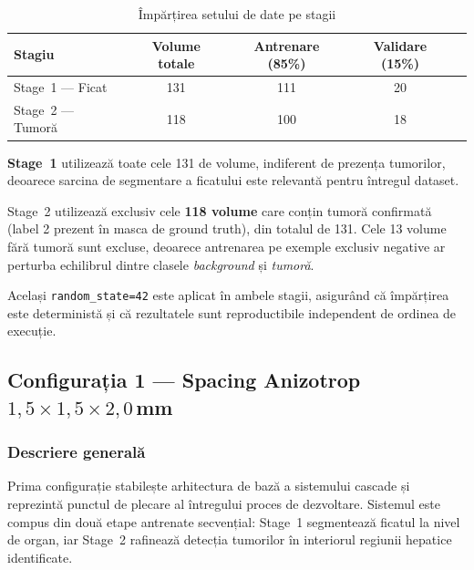 \documentclass[12pt, a4paper]{report}
\begin{document}
\begin{table}[H]
    \centering
    \caption{Împărțirea setului de date pe stagii}
    \label{tab:data_split}
    \begin{tabular}{lcccc}
        \toprule
        \textbf{Stagiu} & \textbf{Volume totale} &
        \textbf{Antrenare (85\%)} & \textbf{Validare (15\%)} \\
        \midrule
        Stage~1 — Ficat  & 131 & 111 & 20 \\
        Stage~2 — Tumoră & 118 & 100 & 18 \\
        \bottomrule
    \end{tabular}
\end{table}

\textbf{Stage~1} utilizează toate cele 131 de volume, indiferent
de prezența tumorilor, deoarece sarcina de segmentare a ficatului
este relevantă pentru întregul dataset.

Stage~2 utilizează exclusiv cele \textbf{118 volume} care conțin
tumoră confirmată (label 2 prezent în masca de ground truth),
din totalul de 131. Cele 13 volume fără tumoră sunt excluse,
deoarece antrenarea pe exemple exclusiv negative ar perturba
echilibrul dintre clasele \textit{background} și \textit{tumoră}.

Același \texttt{random\_state=42} este aplicat în ambele stagii,
asigurând că împărțirea este deterministă și că rezultatele sunt
reproductibile independent de ordinea de execuție.


\subsection{Configurația 1 — Spacing Anizotrop $1{,}5 \times 1{,}5 \times 2{,}0$\,mm}

\subsubsection*{Descriere generală}

Prima configurație stabilește arhitectura de bază a sistemului cascade și
reprezintă punctul de plecare al întregului proces de dezvoltare.
Sistemul este compus din două etape antrenate secvențial: Stage~1 segmentează
ficatul la nivel de organ, iar Stage~2 rafinează detecția tumorilor în interiorul
regiunii hepatice identificate.
\end{document}
